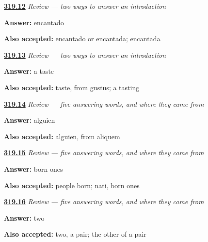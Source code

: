 \noindent\begin{minipage}[t]{\linewidth}
\raggedright
\hyperlink{review-ES-C319-dos-respuestas-spell}{\textbf{319.12}} \emph{Review — two ways to answer an introduction}\par
\small \textbf{Answer:} encantado\par
\footnotesize \textbf{Also accepted:} encantado or encantada; encantada
\end{minipage}\par\medskip

\noindent\begin{minipage}[t]{\linewidth}
\raggedright
\hyperlink{review-ES-C319-dos-respuestas-taste}{\textbf{319.13}} \emph{Review — two ways to answer an introduction}\par
\small \textbf{Answer:} a taste\par
\footnotesize \textbf{Also accepted:} taste, from gustus; a tasting
\end{minipage}\par\medskip

\noindent\begin{minipage}[t]{\linewidth}
\raggedright
\hyperlink{review-ES-C319-repaso-respuestas-pair}{\textbf{319.14}} \emph{Review — five answering words, and where they came from}\par
\small \textbf{Answer:} alguien\par
\footnotesize \textbf{Also accepted:} alguien, from aliquem
\end{minipage}\par\medskip

\noindent\begin{minipage}[t]{\linewidth}
\raggedright
\hyperlink{review-ES-C319-repaso-respuestas-born}{\textbf{319.15}} \emph{Review — five answering words, and where they came from}\par
\small \textbf{Answer:} born ones\par
\footnotesize \textbf{Also accepted:} people born; nati, born ones
\end{minipage}\par\medskip

\noindent\begin{minipage}[t]{\linewidth}
\raggedright
\hyperlink{review-ES-C319-repaso-respuestas-two}{\textbf{319.16}} \emph{Review — five answering words, and where they came from}\par
\small \textbf{Answer:} two\par
\footnotesize \textbf{Also accepted:} two, a pair; the other of a pair
\end{minipage}\par\medskip

